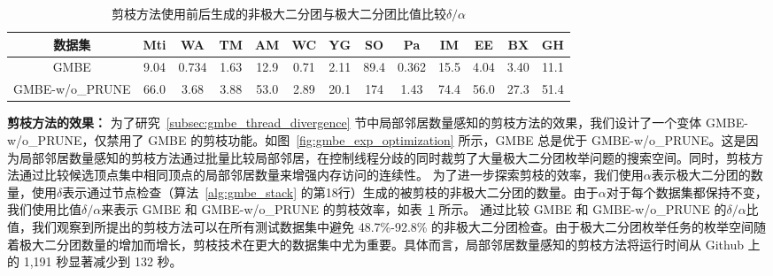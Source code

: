 \begin{table}[t]
  \setlength{\belowcaptionskip}{-0.2cm}
	\centering
	\caption{ 剪枝方法使用前后生成的非极大二分团与极大二分团比值比较$\delta/\alpha$}
	\label{tbl:gmbe_prune}
	\begin{center}
    \setlength{\tabcolsep}{2pt}
		\normalsize
    {
			\begin{tabular}{|c|c|c|c|c|c|c|c|c|c|c|c|c|}
				\hline
        \textbf{数据集} &Mti &WA &TM &AM &WC &YG &SO &Pa &IM &EE &BX &GH \\ \hline
        GMBE &9.04 &0.734 &1.63 &12.9 &0.71 &2.11 &89.4 &0.362 &15.5 &4.04 &3.40 &11.1 \\ 
        GMBE-w/o\_PRUNE &66.0 &3.68 &3.88 &53.0 &2.89 &20.1 &174 &1.43 &74.4 &56.0 &27.3 &51.4 \\ \hline
        

      \end{tabular}
		}
	\end{center}
  \vspace{-0.1in}
\end{table}

\textbf{剪枝方法的效果：} 为了研究~\ref{subsec:gmbe_thread_divergence} 节中局部邻居数量感知的剪枝方法的效果，我们设计了一个变体 GMBE-w/o\_PRUNE，仅禁用了 GMBE 的剪枝功能。如图~\ref{fig:gmbe_exp_optimization} 所示，GMBE 总是优于 GMBE-w/o\_PRUNE。这是因为局部邻居数量感知的剪枝方法通过批量比较局部邻居，在控制线程分歧的同时裁剪了大量极大二分团枚举问题的搜索空间。同时，剪枝方法通过比较候选顶点集中相同顶点的局部邻居数量来增强内存访问的连续性。
为了进一步探索剪枝的效率，我们使用$\alpha$表示极大二分团的数量，使用$\delta$表示通过节点检查（算法~\ref{alg:gmbe_stack} 的第18行）生成的被剪枝的非极大二分团的数量。由于$\alpha$对于每个数据集都保持不变，我们使用比值$\delta/\alpha$来表示 GMBE 和 GMBE-w/o\_PRUNE 的剪枝效率，如表~\ref{tbl:gmbe_prune} 所示。
通过比较 GMBE 和 GMBE-w/o\_PRUNE 的$\delta/\alpha$比值，我们观察到所提出的剪枝方法可以在所有测试数据集中避免 48.7\%-92.8\% 的非极大二分团检查。由于极大二分团枚举任务的枚举空间随着极大二分团数量的增加而增长，剪枝技术在更大的数据集中尤为重要。具体而言，局部邻居数量感知的剪枝方法将运行时间从 Github 上的 1,191 秒显著减少到 132 秒。

